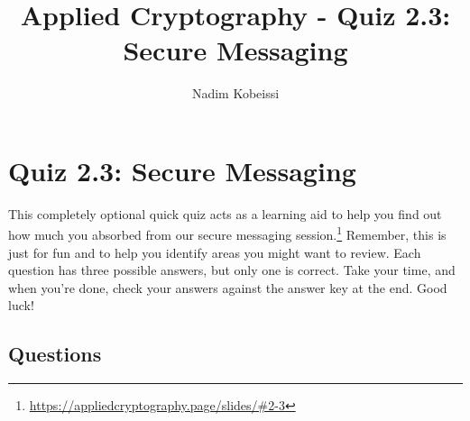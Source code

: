 \documentclass[10pt,a4paper,american]{exam}
\title{Applied Cryptography - Quiz 2.3: Secure Messaging}
\author{Nadim Kobeissi}
\begin{document}
\classhandoutheader
\section*{Quiz 2.3: Secure Messaging}

\begin{tcolorbox}[colframe=OliveGreen!30!white,colback=OliveGreen!5!white]
	This completely optional quick quiz acts as a learning aid to help you find out how much you absorbed from our secure messaging session.\footnote{\url{https://appliedcryptography.page/slides/\#2-3}} Remember, this is just for fun and to help you identify areas you might want to review. Each question has three possible answers, but only one is correct. Take your time, and when you're done, check your answers against the answer key at the end. Good luck!
\end{tcolorbox}

\subsection*{Questions}
\end{document}
